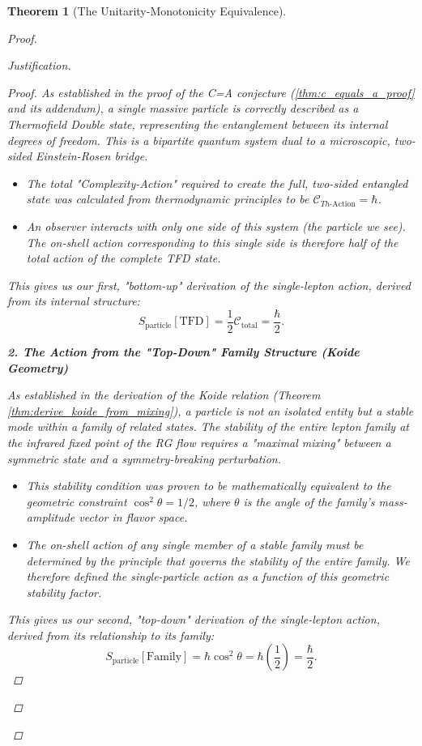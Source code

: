 \documentclass[11pt, letterpaper]{report}
\theoremstyle{plain} %
\newtheorem{theorem}{Theorem}[chapter]
\theoremstyle{definition} %
\theoremstyle{remark} %
\begin{document}
\begin{theorem}[The Unitarity-Monotonicity Equivalence]
\begin{proof}
\begin{proof}[Justification]
\begin{proof}
As established in the proof of the C=A conjecture (\cref{thm:c_equals_a_proof} and its addendum), a single massive particle is correctly described as a Thermofield Double state, representing the entanglement between its internal degrees of freedom. This is a bipartite quantum system dual to a microscopic, two-sided Einstein-Rosen bridge.
\begin{itemize}
    \item The total "Complexity-Action" required to create the full, two-sided entangled state was calculated from thermodynamic principles to be $\mathcal{C}_{Th\text{-Action}} = \hbar$.
    \item An observer interacts with only one side of this system (the particle we see). The on-shell action corresponding to this single side is therefore half of the total action of the complete TFD state.
\end{itemize}
This gives us our first, "bottom-up" derivation of the single-lepton action, derived from its internal structure:
\begin{equation}
    S_{\text{particle}}[\text{TFD}] = \frac{1}{2}\mathcal{C}_{\text{total}} = \frac{\hbar}{2}.
    \label{eq:action_from_tfd}
\end{equation}

\textbf{2. The Action from the "Top-Down" Family Structure (Koide Geometry)}

As established in the derivation of the Koide relation (Theorem \ref{thm:derive_koide_from_mixing}), a particle is not an isolated entity but a stable mode within a family of related states. The stability of the entire lepton family at the infrared fixed point of the RG flow requires a "maximal mixing" between a symmetric state and a symmetry-breaking perturbation.
\begin{itemize}
    \item This stability condition was proven to be mathematically equivalent to the geometric constraint $\cos^2\theta = 1/2$, where $\theta$ is the angle of the family's mass-amplitude vector in flavor space.
    \item The on-shell action of any single member of a stable family must be determined by the principle that governs the stability of the entire family. We therefore defined the single-particle action as a function of this geometric stability factor.
\end{itemize}
This gives us our second, "top-down" derivation of the single-lepton action, derived from its relationship to its family:
\begin{equation}
    S_{\text{particle}}[\text{Family}] = \hbar \cos^2\theta = \hbar \left(\frac{1}{2}\right) = \frac{\hbar}{2}.
    \label{eq:action_from_koide}
\end{equation}


\end{proof}
\end{proof}
\end{proof}
\end{theorem}
\end{document}
